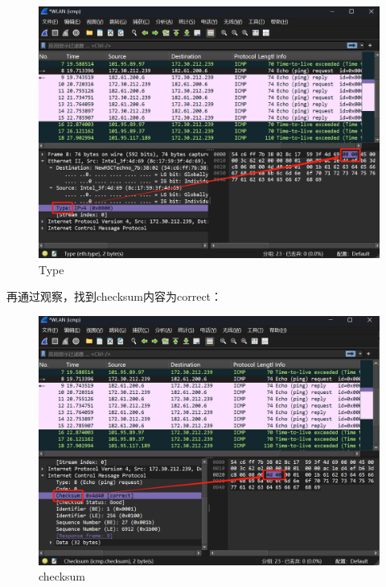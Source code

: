 \documentclass{article}
\begin{document}
	\begin{figure}[H]
		\centering
		\begin{minipage}[b]{0.45\textwidth}
			\includegraphics[width=\textwidth]{images/8.Type.png}
			\caption{Type}
		\end{minipage}
	\end{figure}
	
	再通过观察，找到checksum内容为correct：
	
	\begin{figure}[H]
		\centering
		\begin{minipage}[b]{0.45\textwidth}
			\includegraphics[width=\textwidth]{images/9.checksum.png}
			\caption{checksum}
		\end{minipage}
	\end{figure}
	
\end{document}
